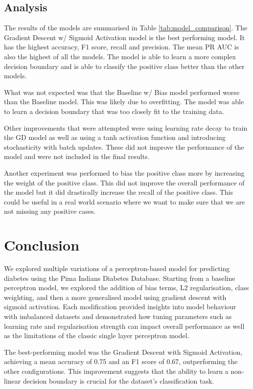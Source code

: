 \subsection{Analysis}

The results of the models are summarised in Table \ref{tab:model_comparison}. The Gradient Descent w/ Sigmoid Activation model is the best performing model. It has the highest accuracy, F1 score, recall and precision. The mean PR AUC is also the highest of all the models. The model is able to learn a more complex decision boundary and is able to classify the positive class better than the other models.

What was not expected was that the Baseline w/ Bias model performed worse than the Baseline model. This was likely due to overfitting. The model was able to learn a decision boundary that was too closely fit to the training data. 


Other improvements that were attempted were using learning rate decay to train the GD model as well as using a tanh activation function and introducing stochasticity with batch updates. These did not improve the performance of the model and were not included in the final results.

Another experiment was performed to bias the positive class more by increasing the weight of the positive class. This did not improve the overall performance of the model but it did drastically increase the recall of the positive class. This could be useful in a real world scenario where we want to make sure that we are not missing any positive cases.


\section{Conclusion}
We explored multiple variations of a perceptron-based model for predicting diabetes using the Pima Indians Diabetes Database. Starting from a baseline perceptron model, we explored the addition of bias terms, L2 regularisation, class weighting, and then a more generalised model using gradient descent with sigmoid activation. Each modification provided insights into model behaviour with imbalanced datasets and demonstrated how tuning parameters such as learning rate and regularisation strength can impact overall performance as well as the limitations of the classic single layer perceptron model.

The best-performing model was the Gradient Descent with Sigmoid Activation, achieving a mean accuracy of 0.75 and an F1 score of 0.67, outperforming the other configurations. This improvement suggests that the ability to learn a non-linear decision boundary is crucial for the dataset's classification task.

